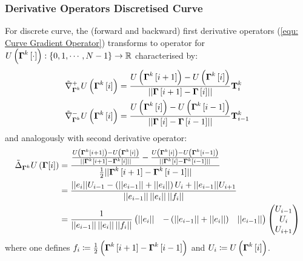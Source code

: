 \documentclass[../dissertation.tex]{subfiles}
\begin{document}
\subsubsection{Derivative Operators Discretised Curve}
For discrete curve, the (forward and backward) first derivative operators (\ref{equ: Curve Gradient Operator}) transforms to operator for $U \left( \boldsymbol{\Gamma}^k \left[ \cdot \right] \right): \left\{ 0, 1, \cdots, N-1 \right\} \rightarrow \mathbb{R}$ characterised by:
\begin{align}
    \tilde{\nabla}_{\boldsymbol{\Gamma}^k}^{+} U \left( \boldsymbol{\Gamma}^k \left[ i \right] \right) &= \frac{U \left( \boldsymbol{\Gamma}^k \left[ i+1 \right] \right) - U \left( \boldsymbol{\Gamma}^k \left[ i \right] \right)}{\lvert \lvert \boldsymbol{\Gamma} \left[ i+1 \right] - \boldsymbol{\Gamma} \left[ i \right] \rvert \rvert} \mathbf{T}_i^k\\
    \tilde{\nabla}_{\boldsymbol{\Gamma}^k}^{-} U \left( \boldsymbol{\Gamma}^k \left[ i \right] \right) &= \frac{U \left( \boldsymbol{\Gamma}^k \left[ i \right] \right) - U \left( \boldsymbol{\Gamma}^k \left[ i-1 \right] \right)}{\lvert \lvert \boldsymbol{\Gamma} \left[ i \right] - \boldsymbol{\Gamma} \left[ i-1 \right] \rvert \rvert} \mathbf{T}_{i-1}^k
\end{align}
and analogously with second derivative operator:
\begin{align}
    \tilde{\Delta}_{\boldsymbol{\Gamma}^k} U \left( \boldsymbol{\Gamma}[i] \right)
    &=
    \frac{\frac{U \left( \boldsymbol{\Gamma}^k [i+1] \right) - U\left( \boldsymbol{\Gamma}^k [i] \right)}{\lvert \lvert \boldsymbol{\Gamma}^k \left[ i+1 \right] - \boldsymbol{\Gamma}^k \left[ i \right] \rvert \rvert} - \frac{U \left( \boldsymbol{\Gamma}^k [i] \right) - U \left( \boldsymbol{\Gamma}^k \left[ i-1 \right] \right)}{\lvert \lvert \boldsymbol{\Gamma}^k[i] - \boldsymbol{\Gamma}^k[i-1] \rvert \rvert}}{\frac{1}{2}\lvert \lvert \boldsymbol{\Gamma}^k \left[ i+1 \right] - \boldsymbol{\Gamma}^k \left[ i-1 \right] \rvert \rvert}
    \label{equ: Discrete Curve Laplacian} \\
    &= 
    \frac{\lvert \lvert e_i \rvert \rvert U_{i-1} - \left( \lvert \lvert e_{i-1} \rvert \rvert + \lvert \lvert e_{i} \rvert \rvert \right) U_i + \lvert \lvert e_{i-1} \rvert \rvert U_{i+1} }{\lvert \lvert e_{i-1} \rvert \rvert \, \lvert \lvert e_i \rvert \rvert \, \lvert \lvert f_i \rvert \rvert} \\
    &= 
    \frac{1}{\lvert \lvert e_{i-1} \rvert \rvert \, \lvert \lvert e_i \rvert \rvert \, \lvert \lvert f_i \rvert \rvert}
    \begin{pmatrix}
        \lvert \lvert e_i \rvert \rvert & -\left( \lvert \lvert e_{i-1} \rvert \rvert + \lvert \lvert e_i \rvert \rvert \right) & \lvert \lvert e_{i-1} \rvert \rvert
    \end{pmatrix}
    \begin{pmatrix}
        U_{i-1} \\
        U_i \\
        U_{i+1}
    \end{pmatrix}
    \label{equ: Discrete Curve Laplacian Matrix Form}
\end{align}
where one defines $f_i \coloneqq \frac{1}{2} \left( \boldsymbol{\Gamma}^k \left[ i+1 \right] - \boldsymbol{\Gamma}^k \left[ i-1 \right] \right)$
and $U_{i} \coloneqq U\left( \boldsymbol{\Gamma}^k \left[ i \right] \right)$.
\end{document}
